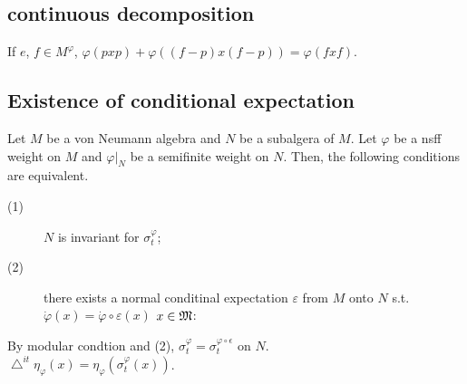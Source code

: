 \subsection{continuous decomposition}

\begin{remark}
  If $e$, $f \in M^\varphi$, $\varphi(pxp) + \varphi((f-p)x(f-p)) = \varphi(fxf)$.
\end{remark}

\subsection{Existence of conditional expectation}

\begin{theorem}
  Let $M$ be a von Neumann algebra and $N$ be a subalgera of $M$.
  Let $\varphi$ be a nsff weight on $M$ and $\varphi|_N$ be a semifinite weight on $N$.
  Then, the following conditions are equivalent.
  \begin{description}
    \item[(1)] $N$ is invariant for $\sigma_t^\varphi$;
    \item[(2)] there exists a normal conditinal expectation $\varepsilon$ from $M$ onto $N$ s.t. $\dot{\varphi}(x) = \dot{\varphi}\circ \varepsilon (x) $ $x \in \mathfrak{M}$:
  \end{description}
\end{theorem}

\begin{remark}
  By modular condtion and (2), $\sigma_t^\varphi = \sigma_t^{\varphi\circ \epsilon}$ on $N$. \\
  $\bigtriangleup^{it}\eta_\varphi(x) = \eta_\varphi(\sigma_t^\varphi(x))$.
\end{remark}

